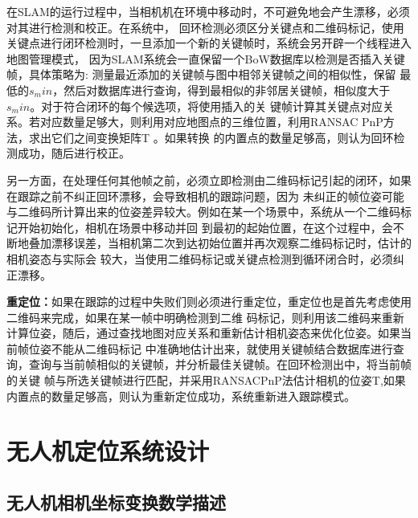 在SLAM的运行过程中，当相机机在环境中移动时，不可避免地会产生漂移，必须对其进行检测和校正。在系统中，
回环检测必须区分关键点和二维码标记，使用关键点进行闭环检测时，一旦添加一个新的关键帧时，系统会另开辟一个线程进入地图管理模式，
因为SLAM系统会一直保留一个BoW数据库以检测是否插入关键帧，具体策略为: 测量最近添加的关键帧与图中相邻关键帧之间的相似性，保留
最低的$s_min$，然后对数据库进行查询，得到最相似的非邻居关键帧，相似度大于$s_min$。对于符合闭环的每个候选项，将使用插入的关
键帧计算其关键点对应关系。若对应数量足够大，则利用对应地图点的三维位置，利用RANSAC PnP方法，求出它们之间变换矩阵T 。如果转换
的内置点的数量足够高，则认为回环检测成功，随后进行校正。

另一方面，在处理任何其他帧之前，必须立即检测由二维码标记引起的闭环，如果在跟踪之前不纠正回环漂移，会导致相机的跟踪问题，因为
未纠正的帧位姿可能与二维码所计算出来的位姿差异较大。例如在某一个场景中，系统从一个二维码标记开始初始化，相机在场景中移动并回
到最初的起始位置，在这个过程中，会不断地叠加漂移误差，当相机第二次到达初始位置并再次观察二维码标记时，估计的相机姿态与实际会
较大，当使用二维码标记或关键点检测到循环闭合时，必须纠正漂移。

\textbf{重定位：}如果在跟踪的过程中失败们则必须进行重定位，重定位也是首先考虑使用二维码来完成，如果在某一帧中明确检测到二维
码标记，则利用该二维码来重新计算位姿，随后，通过查找地图对应关系和重新估计相机姿态来优化位姿。如果当前帧位姿不能从二维码标记
中准确地估计出来，就使用关键帧结合数据库进行查询，查询与当前帧相似的关键帧，并分析最佳关键帧。在回环检测出中，将当前帧的关键
帧与所选关键帧进行匹配，并采用RANSACPnP法估计相机的位姿T,如果内置点的数量足够高，则认为重新定位成功，系统重新进入跟踪模式。
\section{无人机定位系统设计}
\label{sec:2.4}
\subsection{无人机相机坐标变换数学描述}
\label{sec:2.4.1}

